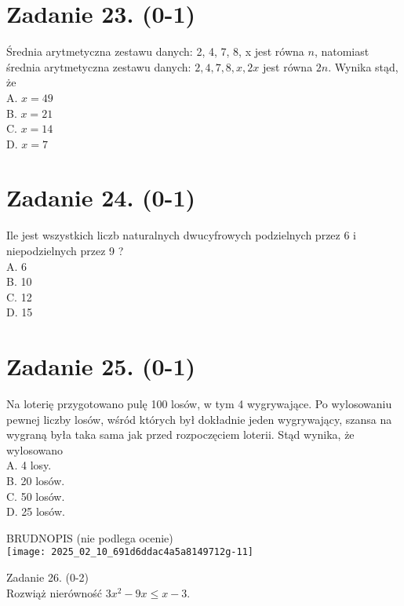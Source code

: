 \documentclass[10pt]{article}
\begin{document}
\section*{Zadanie 23. (0-1)}
Średnia arytmetyczna zestawu danych: 2, 4, 7, 8, x jest równa \(n\), natomiast średnia arytmetyczna zestawu danych: \(2,4,7,8, x, 2 x\) jest równa \(2 n\). Wynika stąd, że\\
A. \(x=49\)\\
B. \(x=21\)\\
C. \(x=14\)\\
D. \(x=7\)

\section*{Zadanie 24. (0-1)}
Ile jest wszystkich liczb naturalnych dwucyfrowych podzielnych przez 6 i niepodzielnych przez 9 ?\\
A. 6\\
B. 10\\
C. 12\\
D. 15

\section*{Zadanie 25. (0-1)}
Na loterię przygotowano pulę 100 losów, w tym 4 wygrywające. Po wylosowaniu pewnej liczby losów, wśród których był dokładnie jeden wygrywający, szansa na wygraną była taka sama jak przed rozpoczęciem loterii. Stąd wynika, że wylosowano\\
A. 4 losy.\\
B. 20 losów.\\
C. 50 losów.\\
D. 25 losów.

BRUDNOPIS (nie podlega ocenie)\\
\texttt{[image: 2025\_02\_10\_691d6ddac4a5a8149712g-11]}

Zadanie 26. (0-2)\\
Rozwiąż nierówność \(3 x^{2}-9 x \leq x-3\).
\end{document}

